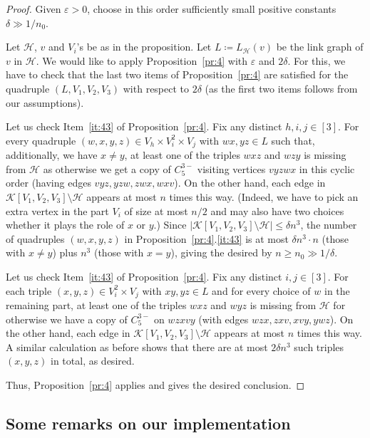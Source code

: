 \documentclass[11pt,a4paper]{article}
\theoremstyle{remark}
\newcommand{\C}[1]{\mathcal{#1}}
\newcommand{\e}{\varepsilon}
\begin{document}
\begin{proof}
 Given $\e>0$, choose in this order sufficiently small positive constants $\delta\gg 1/n_0$. 
 
Let $\C H$, $v$ and $V_i$'s be as in the proposition. Let $L\coloneqq L_{\C H}(v)$ be the link graph of $v$ in $\C H$. We would like to apply Proposition~\ref{pr:4} with $\e$ and $2\delta$. For this, we have to check that the last two items of Proposition~\ref{pr:4} are satisfied for
the quadruple $(L,V_1,V_2,V_3)$ with respect to $2\delta$ (as the first two items follows from our assumptions).

Let us check Item~\ref{it:43} of Proposition~\ref{pr:4}. Fix any distinct $h,i,j\in [3]$. For every quadruple $(w,x,y,z)\in V_h\times V_i^2\times V_j$ with $wx,yz\in L$ such that, additionally, we have $x\not=y$, at least one of the triples $wxz$ and $wzy$ is missing from $\C H$ as otherwise we get a copy of $C_{5}^{3-}$ visiting vertices $vyzwx$ in this cyclic order (having edges $vyz,yzw,zwx,wxv$). On the other hand, each edge in $\mathcal{K}[V_1,V_2,V_3]\setminus \C H$ appears at most $n$ times this way. (Indeed, we have to pick an extra vertex in the part $V_i$ of size at most $n/2$ and may also have two choices whether it plays the role of $x$ or $y$.) Since $|\C K[V_1,V_2,V_3]\setminus \C H|\le \delta n^3$, the number of quadruples $(w,x,y,z)$ in Proposition~\ref{pr:4}.\ref{it:43}  is at most $\delta n^3\cdot n$ (those with $x\not=y$) plus $n^3$ (those with $x=y$), giving the desired by $n\ge n_0\gg 1/\delta$.

Let us check Item~\ref{it:43} of Proposition~\ref{pr:4}. Fix any distinct $i,j\in [3]$. For each triple $(x,y,z)\in V_i^2\times V_j$ with $xy,yz\in L$ and for every choice of $w$ in the remaining part, at least one of the triples $wxz$ and $wyz$ is missing from $\C H$ for otherwise we have a copy of $C_{5}^{3-}$ on $wzxvy$ (with edges $wzx,zxv,xvy,ywz$). On the other hand, each edge in $\mathcal{K}[V_1,V_2,V_3]\setminus \C H$ appears  at most $n$ times this way. A similar calculation as before shows that there are at most $2\delta n^3$ such triples $(x,y,z)$ in total, as desired.

Thus, Proposition~\ref{pr:4} applies and gives the desired conclusion.\end{proof}



\subsection{Some remarks on our implementation}
\end{document}
